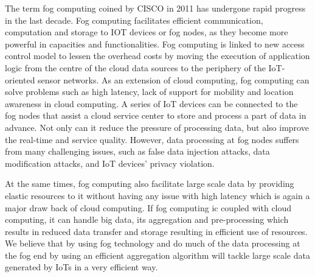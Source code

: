 \documentclass[10pt]{llncs}
\begin{document}
The term fog computing coined by CISCO in 2011 has undergone rapid progress in the last decade. Fog computing facilitates efficient communication, computation and storage to IOT devices or fog nodes, as they become more powerful in capacities and functionalities. Fog computing is linked to new access control model to lessen the overhead costs by moving the execution of application logic from the centre of the cloud data sources to the periphery of the IoT-oriented sensor networks. As an extension of cloud computing, fog computing can solve problems such as high latency, lack of support for mobility and location awareness in cloud computing. A series of IoT devices can be connected to the fog nodes that assist a cloud service center to store and process a part of data in advance. Not only can it reduce the pressure of processing data, but also improve the real-time and service quality. However, data processing at fog nodes suffers from many challenging issues, such as false data injection attacks, data modification attacks, and IoT devices’ privacy violation.

At the same times, fog computing also facilitate large scale data by providing elastic resources to it without having any issue with high latency which is again a major draw back of cloud computing. If fog computing ic coupled with cloud computing, it can handle big data, its aggregation and pre-processing which results in reduced data transfer and storage resulting in efficient use of resources. We believe that by using fog technology and do much of the data processing at the fog end by using an efficient aggregation algorithm will tackle large scale data generated by IoTs in a very efficient way.



%
\end{document}
